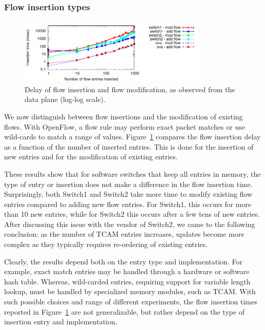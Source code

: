 \subsubsection*{Flow insertion types}

\begin{figure}[h]
  \begin{center}
    \includegraphics[width=0.80\textwidth]{flow_insertion_delay}
  \end{center}
  \caption{Delay of flow insertion and flow modification, as observed
    from the data plane (log-log scale).}
  \label{fig:flow_insertion_delay}
\end{figure}

We now distinguish between flow insertions and the modification of existing flows.  
With OpenFlow, a flow rule may perform exact packet matches or use wild-cards to 
match a range of values. Figure~\ref{fig:flow_insertion_delay} compares the flow
insertion delay as a function of the number of inserted entries. This is done for the 
insertion of new entries and for the modification of existing entries.

These results show that for software switches that keep all entries in memory, the 
type of entry or insertion does not make a difference in the flow insertion time.
Surprisingly, both Switch1 and Switch2 take more time to modify existing flow entries 
compared to adding new flow entries.  For Switch1, this occurs for more than 10 new 
entries, while for Switch2 this occurs after a few tens of new entries.
After discussing this issue with the vendor of Switch2, we came to the
following conclusion: as the number of TCAM entries increases, updates
become more complex as they typically requires re-ordering of existing
entries.

Clearly, the results depend both on the entry type and implementation.
For example, exact match entries may be handled through a hardware or
software hash table. Whereas, wild-carded entries, requiring support
for variable length lookup, must be handled by specialized memory
modules, such as TCAM. With such possible choices and range of
different experiments, the flow insertion times reported in
Figure~\ref{fig:flow_insertion_delay} are not generalizable, but
rather depend on the type of insertion entry and implementation.

